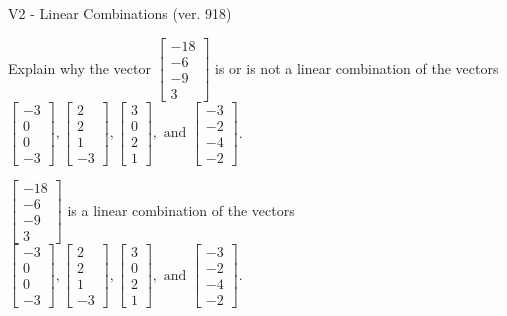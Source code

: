 \begin{exercise}
  \begin{exerciseTitle}V2 - Linear Combinations (ver. 918)\end{exerciseTitle}
  \begin{exerciseStatement}
    Explain why the vector \(\left[\begin{array}{c}
-18 \\
-6 \\
-9 \\
3
\end{array}\right]\)  is or is not a linear 
	combination of the vectors \(\left[\begin{array}{c}
-3 \\
0 \\
0 \\
-3
\end{array}\right] , \left[\begin{array}{c}
2 \\
2 \\
1 \\
-3
\end{array}\right] , \left[\begin{array}{c}
3 \\
0 \\
2 \\
1
\end{array}\right] , \text{ and } \left[\begin{array}{c}
-3 \\
-2 \\
-4 \\
-2
\end{array}\right]\).
	


  \end{exerciseStatement}
  \begin{exerciseAnswer}
   \(\left[\begin{array}{c}
-18 \\
-6 \\
-9 \\
3
\end{array}\right]\) 
  	 is  
	a linear combination of the vectors \(\left[\begin{array}{c}
-3 \\
0 \\
0 \\
-3
\end{array}\right] , \left[\begin{array}{c}
2 \\
2 \\
1 \\
-3
\end{array}\right] , \left[\begin{array}{c}
3 \\
0 \\
2 \\
1
\end{array}\right] , \text{ and } \left[\begin{array}{c}
-3 \\
-2 \\
-4 \\
-2
\end{array}\right]\).


\end{exerciseAnswer}
\end{exercise}
